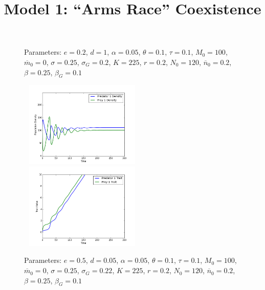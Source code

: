 \documentclass{amsart}
\theoremstyle{definition}
\theoremstyle{remark}
\numberwithin{equation}{section}
\begin{document}
\begin{centering}
\begin{figure}
		\caption{\footnotesize Parameters: $e = 0.2$, $d = 1$, $\alpha = 0.05$, $\theta = 0.1$, $\tau = 0.1$, $M_0 = 100$, $\overline{m}_0 = 0$, $\sigma = 0.25$, $\sigma_G = 0.2$, $K = 225$, $r = 0.2$, $N_0 = 120$, $\overline{n}_0 = 0.2$, $\beta = 0.25$, $\beta_G = 0.1$}
		\label{fig:constant_growth_coexistence_equilibrium}
	\end{figure}
	\begin{figure}
		\title{\bf Model 1: ``Arms Race'' Coexistence\\}
		\includegraphics[width=6cm,height=4.1cm]{figures/1x1/constant_growth/densities_unstable_coexistence.png}
		\includegraphics[width=6cm,height=4.1cm]{figures/1x1/constant_growth/traits_unstable_coexistence.png}
		\caption{\footnotesize Parameters: $e = 0.5$, $d = 0.05$, $\alpha = 0.05$, $\theta = 0.1$, $\tau = 0.1$, $M_0 = 100$, $\overline{m}_0 = 0$, $\sigma = 0.25$, $\sigma_G = 0.22$, $K = 225$, $r = 0.2$, $N_0 = 120$, $\overline{n}_0 = 0.2$, $\beta = 0.25$, $\beta_G = 0.1$}
		\label{fig:constant_growth_arms_race_coexistence}
	\end{figure}
\end{centering}
\end{document}

